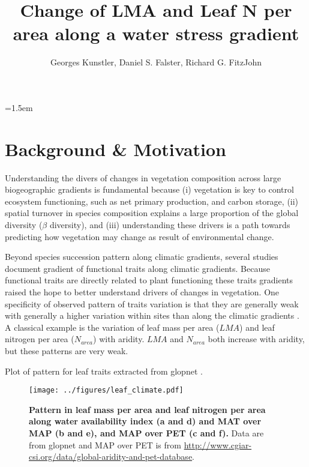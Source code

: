 \documentclass[a4paper,11pt]{article}
\title{Change of LMA and Leaf N per area along a water stress gradient}
\author{Georges Kunstler, Daniel S. Falster, Richard G. FitzJohn}
\date{}
\affiliation{Irstea, Grenoble, France and Department of Biological Sciences, Macquarie University,
  Sydney, Australia}
\date{}
\begin{document}
\mstitleshort
\parindent=1.5em
\addtolength{\parskip}{.3em}


\section{Background \& Motivation}

Understanding the divers of changes in vegetation composition across large biogeographic gradients is fundamental because (i) vegetation is key to control ecosystem functioning, such as net primary production, and carbon storage, (ii) spatial turnover in species composition explains a large proportion of the global diversity ($\beta$ diversity), and (iii) understanding these drivers is a path towards predicting how vegetation may change as result of environmental change.

Beyond species succession pattern along climatic gradients, several
studies document gradient of functional traits along climatic
gradients. Because functional traits are directly related to plant functioning these traits gradients raised the hope to better understand drivers of changes in vegetation. One specificity of observed pattern of traits variation is
that they are generally weak with generally a higher variation within
sites than along the climatic gradients \citep[see][]{Wright-2004}. A
classical example is the variation of leaf mass per area ($LMA$) and
leaf nitrogen per area ($N_{area}$) with aridity. $LMA$
\citep{Wright-2004,Onoda-2011,Moles-2014} and $N_{area}$
\citep{Wright-2005,Maire-2015} both increase with aridity, but these
patterns are very weak.


Plot of pattern for leaf traits extracted from glopnet \citep{Wright-2004}.

\begin{figure}[ht]
\centering
\texttt{[image: ../figures/leaf\_climate.pdf]}
\caption{\textbf{Pattern in leaf mass per area and leaf nitrogen per area along water availability index (a and d) and MAT over MAP (b and e), and MAP over PET (c and f).} Data are from glopnet \citep{Wright-2004} and MAP over PET is from \url{http://www.cgiar-csi.org/data/global-aridity-and-pet-database}.
\label{fig:leafpattern}}
\end{figure}
\end{document}
